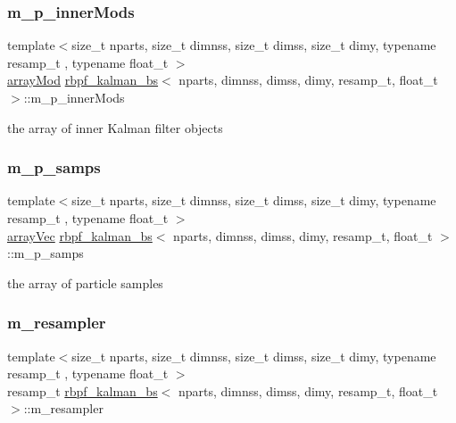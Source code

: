 \subsubsection{\texorpdfstring{m\+\_\+p\+\_\+inner\+Mods}{m\_p\_innerMods}}
{\footnotesize\ttfamily template$<$size\+\_\+t nparts, size\+\_\+t dimnss, size\+\_\+t dimss, size\+\_\+t dimy, typename resamp\+\_\+t , typename float\+\_\+t $>$ \\
\hyperlink{classrbpf__kalman__bs_a009e7dcc39c6a256a6de6ce36df7d033}{array\+Mod} \hyperlink{classrbpf__kalman__bs}{rbpf\+\_\+kalman\+\_\+bs}$<$ nparts, dimnss, dimss, dimy, resamp\+\_\+t, float\+\_\+t $>$\+::m\+\_\+p\+\_\+inner\+Mods\hspace{0.3cm}{\ttfamily [private]}}

the array of inner Kalman filter objects \mbox{\label{classrbpf__kalman__bs_a301e07b418473f266af0b4ad05e82a04}} 
\subsubsection{\texorpdfstring{m\+\_\+p\+\_\+samps}{m\_p\_samps}}
{\footnotesize\ttfamily template$<$size\+\_\+t nparts, size\+\_\+t dimnss, size\+\_\+t dimss, size\+\_\+t dimy, typename resamp\+\_\+t , typename float\+\_\+t $>$ \\
\hyperlink{classrbpf__kalman__bs_ae4f4df4fb0cffea207901b0d358a519b}{array\+Vec} \hyperlink{classrbpf__kalman__bs}{rbpf\+\_\+kalman\+\_\+bs}$<$ nparts, dimnss, dimss, dimy, resamp\+\_\+t, float\+\_\+t $>$\+::m\+\_\+p\+\_\+samps\hspace{0.3cm}{\ttfamily [private]}}

the array of particle samples \mbox{\label{classrbpf__kalman__bs_a9ec4d8c343bb45953ef2eac0e0e3210b}} 
\subsubsection{\texorpdfstring{m\+\_\+resampler}{m\_resampler}}
{\footnotesize\ttfamily template$<$size\+\_\+t nparts, size\+\_\+t dimnss, size\+\_\+t dimss, size\+\_\+t dimy, typename resamp\+\_\+t , typename float\+\_\+t $>$ \\
resamp\+\_\+t \hyperlink{classrbpf__kalman__bs}{rbpf\+\_\+kalman\+\_\+bs}$<$ nparts, dimnss, dimss, dimy, resamp\+\_\+t, float\+\_\+t $>$\+::m\+\_\+resampler\hspace{0.3cm}{\ttfamily [private]}}

